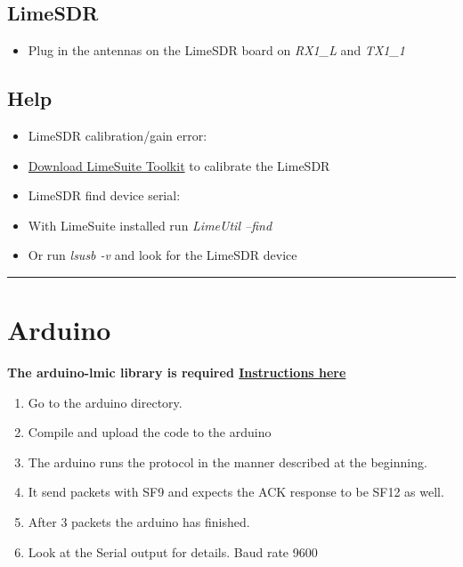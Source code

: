 \subsection{LimeSDR}\label{limesdr}

\begin{itemize}
\tightlist
\item
  Plug in the antennas on the LimeSDR board on \emph{RX1\_L} and
  \emph{TX1\_1}
\end{itemize}

\subsection{Help}\label{help}

\begin{itemize}
\item
  LimeSDR calibration/gain error:
\item
  \href{https://wiki.myriadrf.org/Lime_Suite}{Download LimeSuite
  Toolkit} to calibrate the LimeSDR
\item
  LimeSDR find device serial:
\item
  With LimeSuite installed run \emph{LimeUtil --find}
\item
  Or run \emph{lsusb -v} and look for the LimeSDR device
\end{itemize}

\begin{center}\rule{0.5\linewidth}{\linethickness}\end{center}

\section{Arduino}\label{arduino}

\textbf{The arduino-lmic library is required
\href{https://github.com/matthijskooijman/arduino-lmic}{Instructions
here}}

\begin{enumerate}
\def\labelenumi{\arabic{enumi}.}
\tightlist
\item
  Go to the arduino directory.
\item
  Compile and upload the code to the arduino
\item
  The arduino runs the protocol in the manner described at the
  beginning.
\item
  It send packets with SF9 and expects the ACK response to be SF12 as
  well.
\item
  After 3 packets the arduino has finished.
\item
  Look at the Serial output for details. Baud rate 9600
\end{enumerate}

